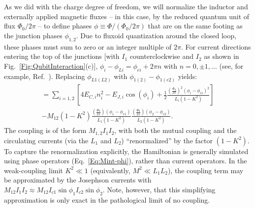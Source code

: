 \documentclass[aip,apr,twocolumn,showpacs,superscriptaddress,groupedaddress,nofootinbib,reprint]{revtex4-1}  %
\begin{document}
As we did with the charge degree of freedom, we will normalize the inductor and externally applied magnetic fluxes -- in this case, by the reduced quantum unit of flux $\Phi_0/2\pi$ --  to define phases $\phi \equiv \Phi/(\Phi_0/2\pi)$ that are on the same footing as the junction phases $\phi_{1,2}$. Due to fluxoid quantization around the closed loop, these phases must sum to zero or an integer multiple of $2\pi$. For current directions entering the top of the junctions [with $I_1$ counterclockwise and $I_2$ as shown in Fig.~\ref{Fig:QubitInteraction}(c)], $\phi_{i}-\phi_{Li} = \phi_{ei}+ 2\pi n$ with $n=0, \pm1,\ldots$ (see, for example, Ref.~). Replacing $\phi_{L1(L2)}$ with $\phi_{1(2)} - \phi_{1(e2)}$  yields:
%
\begin{multline}
= \sum_{i = 1,2} \left[ 4E_{C,i}n_{i}^2 - E_{J,i}\cos(\phi_i) +
                \frac{1}{2} \frac{\left(\frac{\Phi_0}{2\pi}\right)^2 (\phi_{i} - \phi_{ei})^2 }{L_i(1-K^2)}\right]
\\
%
    - M_{12}(1-K^2) \frac{\left(\frac{\Phi_0}{2\pi}\right) (\phi_{1} - \phi_{e1})}{L_1(1-K^2)}\frac{\left(\frac{\Phi_0}{2\pi}\right)(\phi_{2} - \phi_{e2})}{L_2(1-K^2)}.
\label{Eq:Mint-phi}
\end{multline}
%
The coupling is of the form $M_{1,2} I_1 I_2$, with both the mutual coupling and the circulating currents (via the $L_1$ and $L_2$) ``renormalized'' by the factor $(1-K^2)$. To capture the renormalization explicitly, the Hamiltonian is generally simulated using phase operators (Eq.~\ref{Eq:Mint-phi}), rather than current operators.
In the weak-coupling limit $K^2 \ll 1$ (equivalently, $M^2 \ll L_1 L_2 $), the coupling term may be approximated by the Josephson currents with $M_{12} I_1 I_2 \approx M_{12} I_{c1}\sin \phi_1 I_{c2} \sin \phi_2$. Note, however, that this simplifying approximation is only exact in the pathological limit of no coupling. 
\end{document}
